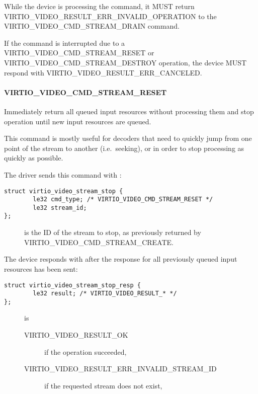 While the device is processing the command, it MUST return
VIRTIO\_VIDEO\_RESULT\_ERR\_INVALID\_OPERATION to the
VIRTIO\_VIDEO\_CMD\_STREAM\_DRAIN command.

If the command is interrupted due to a VIRTIO\_VIDEO\_CMD\_STREAM\_RESET
or VIRTIO\_VIDEO\_CMD\_STREAM\_DESTROY operation, the device MUST
respond with VIRTIO\_VIDEO\_RESULT\_ERR\_CANCELED.

\paragraph{VIRTIO_VIDEO_CMD_STREAM_RESET}\label{sec:Device Types / Video Device / Device Operation / Device Operation: Stream commands / VIRTIO_VIDEO_CMD_STREAM_RESET}

Immediately return all queued input resources without processing them
and stop operation until new input resources are queued.

This command is mostly useful for decoders that need to quickly jump
from one point of the stream to another (i.e.~seeking), or in order to
stop processing as quickly as possible.

The driver sends this command with
:

\begin{lstlisting}
struct virtio_video_stream_stop {
        le32 cmd_type; /* VIRTIO_VIDEO_CMD_STREAM_RESET */
        le32 stream_id;
};
\end{lstlisting}

\begin{description}
\item[]
is the ID of the stream to stop, as previously returned by
VIRTIO\_VIDEO\_CMD\_STREAM\_CREATE.
\end{description}

The device responds with 
after the response for all previously queued input resources has been
sent:

\begin{lstlisting}
struct virtio_video_stream_stop_resp {
        le32 result; /* VIRTIO_VIDEO_RESULT_* */
};
\end{lstlisting}

\begin{description}
\item[]
is

\begin{description}
\item[VIRTIO\_VIDEO\_RESULT\_OK]
if the operation succeeded,
\item[VIRTIO\_VIDEO\_RESULT\_ERR\_INVALID\_STREAM\_ID]
if the requested stream does not exist,
\end{description}
\end{description}

